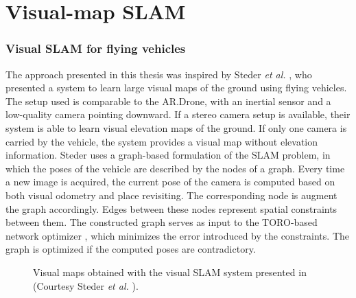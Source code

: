\section{Visual-map SLAM}

\subsubsection{Visual SLAM for flying vehicles}
The approach presented in this thesis was inspired by Steder \textit{et al.} \cite{steder2008visual}, who presented a system to learn large visual maps of the ground using flying vehicles.
The setup used is comparable to the AR.Drone, with an inertial sensor and a low-quality camera pointing downward.
If a stereo camera setup is available, their system is able to learn visual elevation maps of the ground.
If only one camera is carried by the vehicle, the system provides a visual map without elevation information.
Steder uses a graph-based formulation of the SLAM problem, in which the poses of the vehicle are described by the nodes of a graph.
Every time a new image is acquired, the current pose of the camera is computed based on both visual odometry and place revisiting.
The corresponding node is augment the graph accordingly.
Edges between these nodes represent spatial constraints between them.
The constructed graph serves as input to the TORO-based network optimizer \cite{Grisetti2007iros}, which minimizes the error introduced by the constraints.
The graph is optimized if the computed poses are contradictory.

\begin{figure}[htb!]
  \begin{center}
    \hspace{1cm}
   
  \end{center}
  \caption{Visual maps obtained with the visual SLAM system presented in \cite{steder2008visual} (Courtesy Steder \textit{et al.} \cite{steder2008visual}).}
  \label{featureImg}
\end{figure}

